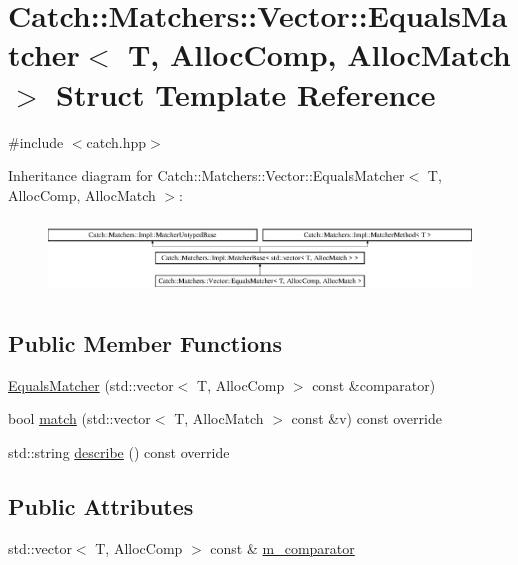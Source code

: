 \hypertarget{struct_catch_1_1_matchers_1_1_vector_1_1_equals_matcher}{}\section{Catch\+:\+:Matchers\+:\+:Vector\+:\+:Equals\+Matcher$<$ T, Alloc\+Comp, Alloc\+Match $>$ Struct Template Reference}
\label{struct_catch_1_1_matchers_1_1_vector_1_1_equals_matcher}


{\ttfamily \#include $<$catch.\+hpp$>$}

Inheritance diagram for Catch\+:\+:Matchers\+:\+:Vector\+:\+:Equals\+Matcher$<$ T, Alloc\+Comp, Alloc\+Match $>$\+:\begin{figure}[H]
\begin{center}
\leavevmode
\includegraphics[height=2.000000cm]{struct_catch_1_1_matchers_1_1_vector_1_1_equals_matcher}
\end{center}
\end{figure}
\subsection*{Public Member Functions}
\begin{DoxyCompactItemize}
\item 
\mbox{\hyperlink{struct_catch_1_1_matchers_1_1_vector_1_1_equals_matcher_aca4855dbe43977f4aceae8fd0a0422a8}{Equals\+Matcher}} (std\+::vector$<$ T, Alloc\+Comp $>$ const \&comparator)
\item 
bool \mbox{\hyperlink{struct_catch_1_1_matchers_1_1_vector_1_1_equals_matcher_a4d46442b9d25b2234138359faab4f19d}{match}} (std\+::vector$<$ T, Alloc\+Match $>$ const \&v) const override
\item 
std\+::string \mbox{\hyperlink{struct_catch_1_1_matchers_1_1_vector_1_1_equals_matcher_a398b5cc80200b3b45922c36bddcb4b37}{describe}} () const override
\end{DoxyCompactItemize}
\subsection*{Public Attributes}
\begin{DoxyCompactItemize}
\item 
std\+::vector$<$ T, Alloc\+Comp $>$ const  \& \mbox{\hyperlink{struct_catch_1_1_matchers_1_1_vector_1_1_equals_matcher_aaa9099439a6f553fe47ff5ac2fdf3b3c}{m\+\_\+comparator}}
\end{DoxyCompactItemize}
